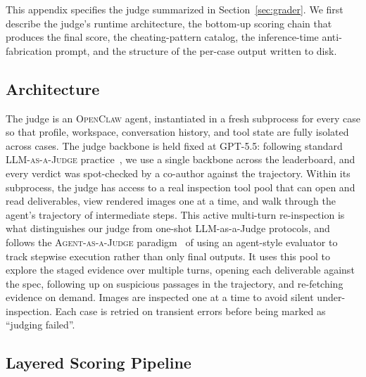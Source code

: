 \documentclass{llmxive}
\providecommand{\section}[1]{  \oldappendixsection{#1}  \setcounter{table}{0}  \setcounter{figure}{0}}
\begin{document}
\FloatBarrier
\section{Trajectory-aware Agent as Judge}
\label{app:grader}

This appendix specifies the judge summarized in Section~\ref{sec:grader}. We first describe the judge's runtime architecture, the bottom-up scoring chain that produces the final score, the cheating-pattern catalog, the inference-time anti-fabrication prompt, and the structure of the per-case output written to disk.

\subsection{Architecture}
\label{app:arch}

The judge is an \textsc{OpenClaw} agent, instantiated in a fresh subprocess for every case so that profile, workspace, conversation history, and tool state are fully isolated across cases. The judge backbone is held fixed at GPT-5.5: following standard \textsc{LLM-as-a-Judge} practice~\citep{zheng2023llmjudge,liu2023geval}, we use a single backbone across the leaderboard, and every verdict was spot-checked by a co-author against the trajectory. Within its subprocess, the judge has access to a real inspection tool pool that can open and read deliverables, view rendered images one at a time, and walk through the agent's trajectory of intermediate steps. This active multi-turn re-inspection is what distinguishes our judge from one-shot LLM-as-a-Judge protocols, and follows the \textsc{Agent-as-a-Judge} paradigm~\citep{zhuge2024agentasjudge} of using an agent-style evaluator to track stepwise execution rather than only final outputs. It uses this pool to explore the staged evidence over multiple turns, opening each deliverable against the spec, following up on suspicious passages in the trajectory, and re-fetching evidence on demand. Images are inspected one at a time to avoid silent under-inspection. Each case is retried on transient errors before being marked as ``judging failed''.

\subsection{Layered Scoring Pipeline}
\label{app:axes}
\end{document}
